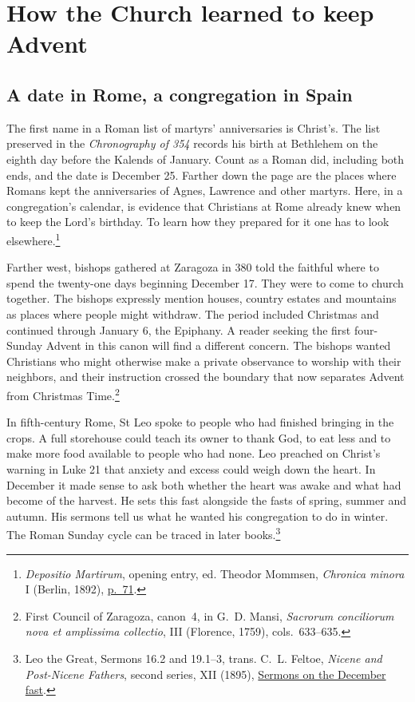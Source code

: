 \section{How the Church learned to keep Advent}

\subsection{A date in Rome, a congregation in Spain}

The first name in a Roman list of martyrs' anniversaries is Christ's. The list
preserved in the \emph{Chronography of 354} records his birth at Bethlehem on
the eighth day before the Kalends of January. Count as a Roman did, including
both ends, and the date is December 25. Farther down the page are the places
where Romans kept the anniversaries of Agnes, Lawrence and other martyrs.
Here, in a congregation's calendar, is evidence that Christians at Rome already
knew when to keep the Lord's birthday. To learn how they prepared for it one
has to look elsewhere.\footnote{\emph{Depositio Martirum}, opening entry,
ed. Theodor Mommsen, \emph{Chronica minora} I (Berlin, 1892),
\href{https://www.dmgh.de/mgh_auct_ant_9/index.htm\#page/71/mode/1up}{p.~71}.}

Farther west, bishops gathered at Zaragoza in 380 told the faithful where
to spend the twenty-one days beginning December 17. They were to come to
church together. The bishops expressly mention houses, country estates and
mountains as places where people might withdraw. The period included Christmas
and continued through January 6, the Epiphany. A reader seeking the first
four-Sunday Advent in this canon will find a different concern. The bishops
wanted Christians who might otherwise make a private observance to worship
with their neighbors, and their instruction crossed the boundary that now
separates Advent from Christmas Time.\footnote{First Council of Zaragoza,
canon~4, in G.~D. Mansi, \emph{Sacrorum conciliorum nova et amplissima
collectio}, III (Florence, 1759), cols.~633--635.}

In fifth-century Rome, St Leo spoke to people who had finished bringing in
the crops. A full storehouse could teach its owner to thank God, to eat less
and to make more food available to people who had none. Leo preached on
Christ's warning in Luke 21 that anxiety and excess could weigh down the
heart. In December it made sense to ask both whether the heart was awake
and what had become of the harvest. He sets this fast alongside the fasts of
spring, summer and autumn. His sermons tell us what he wanted his congregation
to do in winter. The Roman Sunday cycle can be traced in later books.\footnote{Leo
the Great, Sermons 16.2 and 19.1--3, trans. C.~L. Feltoe,
\emph{Nicene and Post-Nicene Fathers}, second series, XII (1895),
\href{https://www.ccel.org/ccel/schaff/npnf212.html}{Sermons on the December fast}.}

